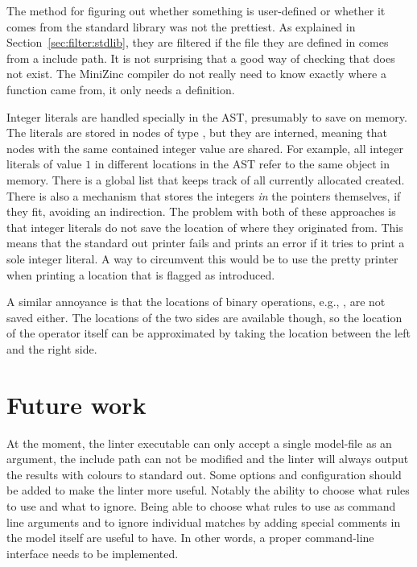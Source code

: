 \documentclass[a4paper,12pt]{article}
\begin{document}
The method for figuring out whether something is user-defined or whether it comes from the
standard library was not the prettiest. As explained in Section~\ref{sec:filter:stdlib},
they are filtered if the file they are defined in comes from a include path. It is not
surprising that a good way of checking that does not exist. The MiniZinc compiler do not
really need to know exactly where a function came from, it only needs a definition.

Integer literals are handled specially in the AST, presumably to save on memory. The
literals are stored in nodes of type , but they are interned, meaning that
nodes with the same contained integer value are shared. For example, all integer literals
of value $1$ in different locations in the AST refer to the same object in memory. There
is a global list that keeps track of all currently allocated  created. There is
also a mechanism that stores the integers \emph{in} the pointers themselves, if they fit,
avoiding an indirection. The problem with both of these approaches is that integer
literals do not save the location of where they originated from. This means that the
standard out printer fails and prints an error if it tries to print a sole integer
literal. A way to circumvent this would be to use the pretty printer when printing a
location that is flagged as introduced.

A similar annoyance is that the locations of binary operations, e.g., \mi{/\\}, are not
saved either. The locations of the two sides are available though, so the location of the
operator itself can be approximated by taking the location between the left and the right
side.

\section{Future work}
At the moment, the linter executable can only accept a single model-file as an argument,
the include path can not be modified and the linter will always output the results with
colours to standard out.
Some options and configuration should be added to make the linter more useful. Notably
the ability to choose what rules to use and what to ignore. Being able to choose what
rules to use as command line arguments and to ignore individual matches by adding special
comments in the model itself are useful to have. In other words, a proper command-line
interface needs to be implemented.
\end{document}
